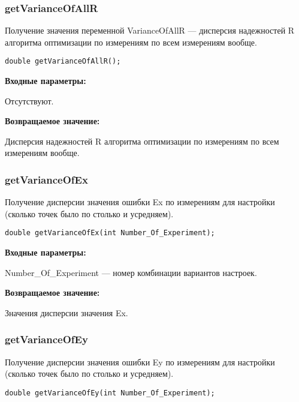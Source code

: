 \documentclass[a4paper,12pt]{article}
\begin{document}
\subsubsection{getVarianceOfAllR}\label{getVarianceOfAllR}

Получение значения переменной VarianceOfAllR --- дисперсия надежностей R алгоритма оптимизации по измерениям по всем измерениям вообще.


\begin{lstlisting}[label=code_syntax_getVarianceOfAllR,caption=Синтаксис]
double getVarianceOfAllR();
\end{lstlisting}

\textbf{Входные параметры:}

Отсутствуют.

\textbf{Возвращаемое значение:}

Дисперсия надежностей R алгоритма оптимизации по измерениям по всем измерениям вообще.


\subsubsection{getVarianceOfEx}\label{getVarianceOfEx}

Получение дисперсии значения ошибки Ex по измерениям для настройки (сколько точек было по столько и усредняем).


\begin{lstlisting}[label=code_syntax_getVarianceOfEx,caption=Синтаксис]
double getVarianceOfEx(int Number_Of_Experiment);
\end{lstlisting}

\textbf{Входные параметры:}

Number\_Of\_Experiment --- номер комбинации вариантов настроек.

\textbf{Возвращаемое значение:}

Значения дисперсии значения Ex.


\subsubsection{getVarianceOfEy}\label{getVarianceOfEy}

Получение дисперсии значения ошибки Ey по измерениям для настройки (сколько точек было по столько и усредняем).


\begin{lstlisting}[label=code_syntax_getVarianceOfEy,caption=Синтаксис]
double getVarianceOfEy(int Number_Of_Experiment);
\end{lstlisting}
\end{document}

